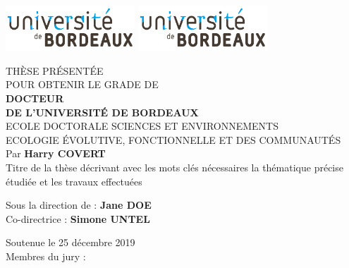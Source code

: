 \pagestyle{empty}
\includegraphics[scale=1, height=1.7cm]{figures/universite_de_bordeaux.pdf}
\hfill
\includegraphics[scale=1, height=1.7cm]{figures/universite_de_bordeaux.pdf}
\hfill
\begin{center}
\doublespacing
\begin{Large}

THÈSE PRÉSENTÉE\\ POUR OBTENIR LE GRADE DE \\
{\LARGE \textbf{DOCTEUR\\DE L'UNIVERSITÉ DE BORDEAUX} } \\
\vspace{0.55cm}
ECOLE DOCTORALE SCIENCES ET ENVIRONNEMENTS\\
{\normalsize ECOLOGIE ÉVOLUTIVE, FONCTIONNELLE ET DES COMMUNAUTÉS} \\
\vspace{0.55cm}
Par \textbf{Harry COVERT} \\
\vspace{0.55cm}
{\Large Titre de la thèse décrivant avec les mots clés nécessaires la thématique précise étudiée et les travaux effectuées}
\end{Large}
\vspace{0.55cm}
\begin{normalsize}
\begin{singlespace}
Sous la direction de : \textbf{Jane DOE}\\
Co-directrice : \textbf{Simone UNTEL}
\end{singlespace}
\end{normalsize}
\end{center}
\vfill
{\large Soutenue le 25 décembre 2019 }\\
\vfill
Membres du jury :
